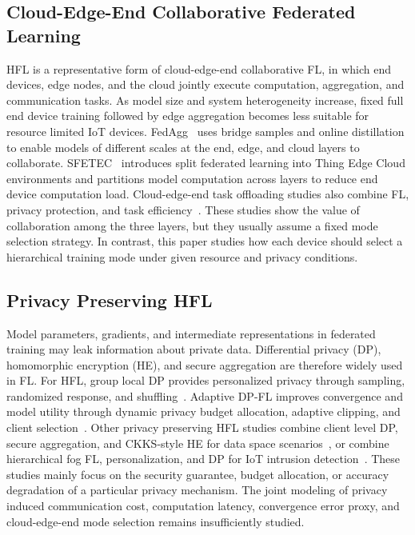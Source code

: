 ﻿\documentclass[preprint,12pt]{elsarticle}
\theoremstyle{plain}
\theoremstyle{definition}
\theoremstyle{remark}
\begin{document}
\subsection{Cloud-Edge-End Collaborative Federated Learning}
HFL is a representative form of cloud-edge-end collaborative FL, in which end devices, edge nodes, and the cloud jointly execute computation, aggregation, and communication tasks.
As model size and system heterogeneity increase, fixed full end device training followed by edge aggregation becomes less suitable for resource limited IoT devices.
FedAgg~\cite{BSBODP} uses bridge samples and online distillation to enable models of different scales at the end, edge, and cloud layers to collaborate.
SFETEC~\cite{SFETEC} introduces split federated learning into Thing Edge Cloud environments and partitions model computation across layers to reduce end device computation load.
Cloud-edge-end task offloading studies also combine FL, privacy protection, and task efficiency~\cite{dong2026privacyoffloading}.
These studies show the value of collaboration among the three layers, but they usually assume a fixed mode selection strategy.
In contrast, this paper studies how each device should select a hierarchical training mode under given resource and privacy conditions.

\subsection{Privacy Preserving HFL}
Model parameters, gradients, and intermediate representations in federated training may leak information about private data.
Differential privacy (DP), homomorphic encryption (HE), and secure aggregation are therefore widely used in FL.
For HFL, group local DP provides personalized privacy through sampling, randomized response, and shuffling~\cite{GLDP}.
Adaptive DP-FL improves convergence and model utility through dynamic privacy budget allocation, adaptive clipping, and client selection~\cite{xu2025adpfl}.
Other privacy preserving HFL studies combine client level DP, secure aggregation, and CKKS-style HE for data space scenarios~\cite{PPHFL}, or combine hierarchical fog FL, personalization, and DP for IoT intrusion detection~\cite{islam2025pphffl}.
These studies mainly focus on the security guarantee, budget allocation, or accuracy degradation of a particular privacy mechanism.
The joint modeling of privacy induced communication cost, computation latency, convergence error proxy, and cloud-edge-end mode selection remains insufficiently studied.
\end{document}

